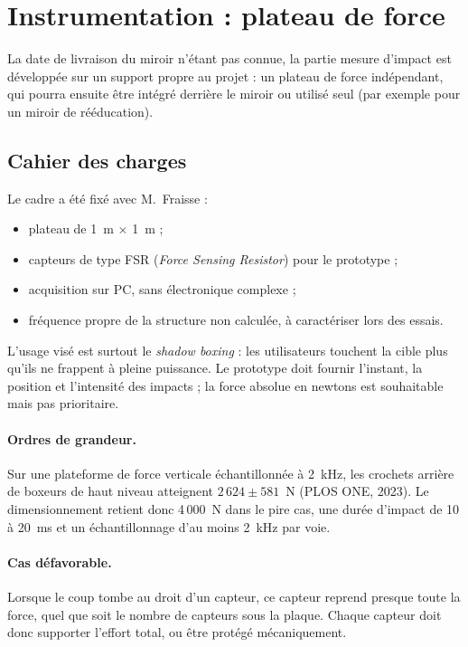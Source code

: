 \section{Instrumentation : plateau de force}
\label{sec:plateau}

La date de livraison du miroir n'étant pas connue, la partie mesure d'impact est développée sur un support propre au projet : un plateau de force indépendant, qui pourra ensuite être intégré derrière le miroir ou utilisé seul (par exemple pour un miroir de rééducation).

\subsection{Cahier des charges}

Le cadre a été fixé avec M.~Fraisse :
\begin{itemize}
  \item plateau de 1~m $\times$ 1~m ;
  \item capteurs de type FSR (\emph{Force Sensing Resistor}) pour le prototype ;
  \item acquisition sur PC, sans électronique complexe ;
  \item fréquence propre de la structure non calculée, à caractériser lors des essais.
\end{itemize}

L'usage visé est surtout le \emph{shadow boxing} : les utilisateurs touchent la cible plus qu'ils ne frappent à pleine puissance. Le prototype doit fournir l'instant, la position et l'intensité des impacts ; la force absolue en newtons est souhaitable mais pas prioritaire.

\paragraph{Ordres de grandeur.} Sur une plateforme de force verticale échantillonnée à 2~kHz, les crochets arrière de boxeurs de haut niveau atteignent $2\,624 \pm 581$~N (PLOS ONE, 2023). Le dimensionnement retient donc 4\,000~N dans le pire cas, une durée d'impact de 10 à 20~ms et un échantillonnage d'au moins 2~kHz par voie.

\paragraph{Cas défavorable.} Lorsque le coup tombe au droit d'un capteur, ce capteur reprend presque toute la force, quel que soit le nombre de capteurs sous la plaque. Chaque capteur doit donc supporter l'effort total, ou être protégé mécaniquement.

